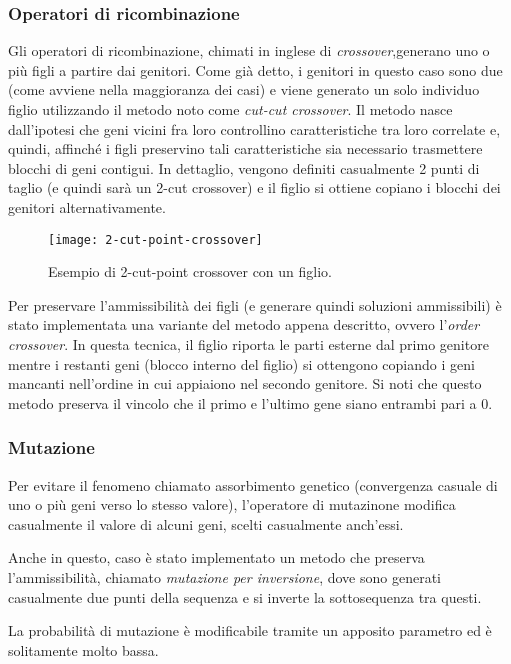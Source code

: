 \subsubsection{Operatori di ricombinazione}\label{subsubsec:operatori-ricombinazione}
Gli operatori di ricombinazione, chimati in inglese di \textit{crossover},generano uno o più figli a partire dai genitori.
Come già detto, i genitori in questo caso sono due (come avviene nella maggioranza dei casi) e viene generato
un solo individuo figlio utilizzando il metodo noto come \textit{cut-cut crossover}.
Il metodo nasce dall'ipotesi che geni vicini fra loro controllino caratteristiche tra loro correlate e, quindi,
affinché i figli preservino tali caratteristiche sia necessario trasmettere blocchi di geni contigui.
In dettaglio, vengono definiti casualmente 2 punti di taglio (e quindi sarà un 2-cut crossover) e il figlio si ottiene
copiano i blocchi dei genitori alternativamente.
\begin{figure}[!h]
\begin{center}
	\texttt{[image: 2-cut-point-crossover]}
{\scriptsize \caption{Esempio di 2-cut-point crossover con un figlio.}
\label{fig:2-cut-point-crossover}}
\end{center}
\end{figure}
Per preservare l'ammissibilità dei figli (e generare quindi soluzioni ammissibili) è stato implementata
una variante del metodo appena descritto, ovvero l'\textit{order crossover}.
In questa tecnica, il figlio riporta le parti esterne dal primo genitore mentre i restanti geni (blocco interno del figlio)
si ottengono copiando i geni mancanti nell'ordine in cui appiaiono nel secondo genitore.
Si noti che questo metodo preserva il vincolo che il primo e l'ultimo gene siano entrambi pari a 0.
\subsubsection{Mutazione}\label{subsubsec:mutazione}
Per evitare il fenomeno chiamato assorbimento genetico (convergenza casuale di uno o più geni verso lo stesso valore),
l'operatore di mutazinone modifica casualmente il valore di alcuni geni, scelti casualmente anch'essi.

Anche in questo, caso è stato implementato un metodo che preserva l'ammissibilità, chiamato \textit{mutazione per inversione},
dove sono generati casualmente due punti della sequenza e si inverte la sottosequenza tra questi.

La probabilità di mutazione è modificabile tramite un apposito parametro ed è solitamente molto bassa.

